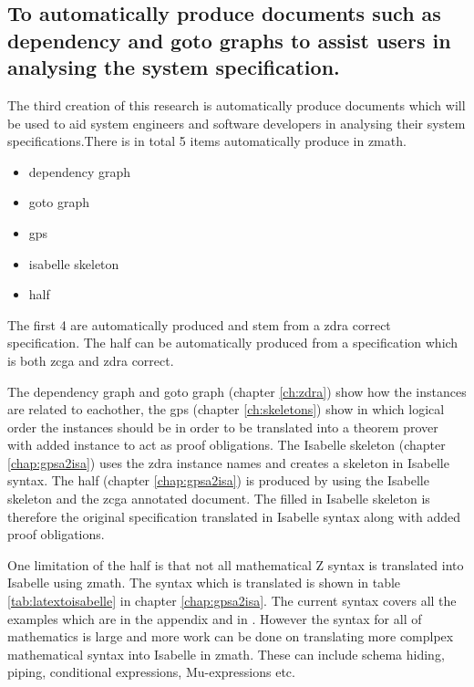 \subsection{To automatically produce documents such as dependency and goto graphs to assist users in analysing the system specification.}

The third creation of this research is automatically produce documents which
will be used to aid system engineers and software developers in analysing their
system specifications.There is in total 5 items automatically produce in
\gls{zmath}.

\begin{itemize}
\item dependency graph

\item goto graph

\item \gls{gps}

\item isabelle skeleton

\item \gls{half}
\end{itemize}

The first 4 are automatically produced and stem from a \gls{zdra} correct
specification. The \gls{half} can be automatically produced from a specification
which is both \gls{zcga} and \gls{zdra} correct.

The dependency graph and goto graph (chapter \ref{ch:zdra}) show how the
instances are related to eachother, the \gls{gps} (chapter \ref{ch:skeletons})
show in which logical order the instances should be in order to be translated
into a theorem prover with added instance to act as proof obligations. The
Isabelle skeleton (chapter \ref{chap:gpsa2isa}) uses the \gls{zdra} instance
names and creates a skeleton in Isabelle syntax. The \gls{half} (chapter
\ref{chap:gpsa2isa}) is produced by using the Isabelle skeleton and the
\gls{zcga} annotated document. The filled in Isabelle skeleton is therefore the
original specification translated in Isabelle syntax along with added proof
obligations.

One limitation of the \gls{half} is that not all mathematical Z syntax is
translated into Isabelle using \gls{zmath}. The syntax which is translated is
shown in table \ref{tab:latextoisabelle} in chapter \ref{chap:gpsa2isa}. The
current syntax covers all the examples which are in the appendix and in
\cite{mathlangexamples}. However the syntax for all of mathematics is large and
more work can be done on translating more complpex mathematical syntax into
Isabelle in \gls{zmath}. These can include schema hiding, piping, conditional
expressions, Mu-expressions \cite{zrefcard} etc.


